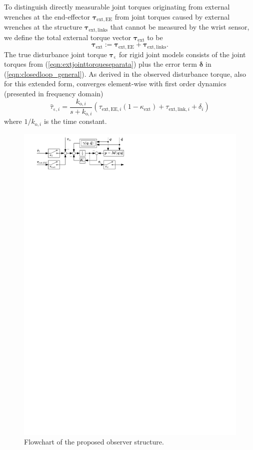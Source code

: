 To distinguish directly measurable joint torques originating from external wrenches at the end-effector $\bm{\tau}_{\mathrm{ext,EE}}$ from joint torques caused by external wrenches at the structure $\bm{\tau}_{\mathrm{ext,links}}$ that cannot be measured by the wrist sensor, we define the total external torque vector $\bm{\tau}_{\mathrm{ext}}$ to be
\begin{equation}
\bm{\tau}_{\mathrm{ext}} := \bm{\tau}_{\mathrm{ext,EE}} + \bm{\tau}_{\mathrm{ext,links}}.
\label{eqn:extjointtorqueseparata}
\end{equation}
The true disturbance joint torque ${\bm{\tau}}_\mathrm{\varepsilon}$ for rigid joint models consists of the joint torques from (\ref{eqn:extjointtorqueseparata}) plus the error term $\bm{\delta}$ in (\ref{eqn:closedloop_general}).
%
As derived in \cite{Haddadin2014} the observed disturbance torque, also for this extended form, converges element-wise with first order dynamics (presented in frequency domain)
\begin{equation}
\hat{\tau}_{\mathrm{\varepsilon},i}=
\frac{k_{\mathrm{o},i}}{s+k_{\mathrm{o},i}}
\left(\tau_{\mathrm{ext,EE},i}(1-\kappa_{\mathrm{ext}})
+ \tau_{\mathrm{ext,link},i}
+ \delta_{i}
\right)
\label{eqn:disttorqueconvergence}
\end{equation}
where $1/k_{\mathrm{o},i}$ is the time constant.
%
\begin{figure}
\centering
\includegraphics{./figures/ObserverFlowChart/observer_scheme}
\caption{Flowchart of the proposed observer structure.}
\label{fig:observer_flowchart}
\SkipBeforeText
\end{figure}
